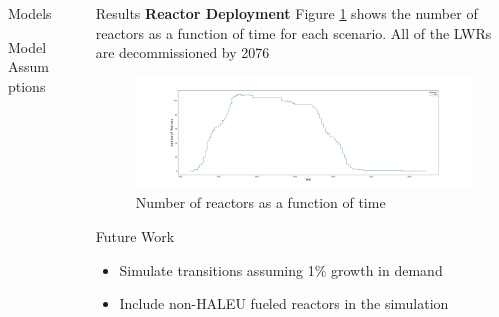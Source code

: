 \documentclass[final]{beamer}
\newlength{\sepwid}
\newlength{\onecolwid}
\newlength{\threecolwid}
\begin{document}
\begin{frame}[t]
\begin{columns}[t,totalwidth=\threecolwid]
\begin{column}{\onecolwid}
\begin{block}{Models}
\begin{alertblock}{Model Assumptions}
\end{alertblock}

\end{block}



\end{column} %

\begin{column}{\sepwid}\end{column} %

\begin{column}{\onecolwid} %

\begin{block}{Results}
\textbf{Reactor Deployment}
Figure \ref{fig:rx_deployment} shows the number of reactors as a function of 
time for each scenario.
All of the \gls{LWR}s are decommissioned by 2076
\begin{figure}
  \centering
  \includegraphics[scale=0.65, trim=100 0 50 50, clip]{rx_deployment_2020.png}
  \caption{Number of reactors as a function of time}
  \label{fig:rx_deployment}
\end{figure}


\end{block}

\begin{alertblock}{Future Work }
\begin{itemize}
		\item Simulate transitions assuming 1\% growth in demand
		\item Include non-\gls{HALEU} fueled reactors in the simulation
\end{itemize}

\end{alertblock}



\end{column}
\end{columns}
\end{frame}
\end{document}
